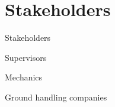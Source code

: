 \section{Stakeholders}
\begin{frame}{Stakeholders}{}
	\item Supervisors
	\item Mechanics
	\item Ground handling companies
\end{frame}